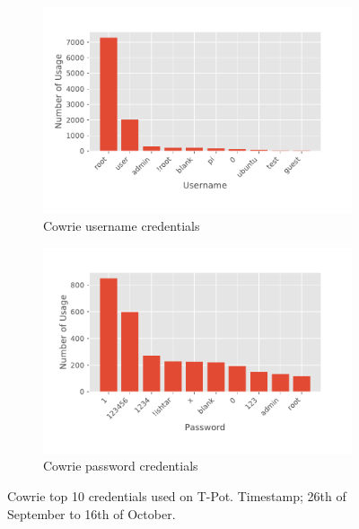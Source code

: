 \begin{figure}
    \begin{subfigure}[b]{0.49\textwidth}
        \centering
        \includegraphics[width=\textwidth]{figures/tpot-cowrie-username.pdf}
        \caption{Cowrie username credentials}
        \label{fig:tpot-cowrie-username}
    \end{subfigure}
    \hfill
    \begin{subfigure}[b]{0.49\textwidth}
        \centering
        \includegraphics[width=\textwidth]{figures/tpot-cowrie-password.pdf}
        \caption{Cowrie password credentials}
        \label{fig:tpot-cowrie-password}
    \end{subfigure}
    \caption[Cowrie top 10 credentials on T-Pot]{
        Cowrie top 10 credentials used on T-Pot.
        Timestamp; 26th of September to 16th of October.
    }
    \label{fig:cowrie-credentials}
\end{figure}

